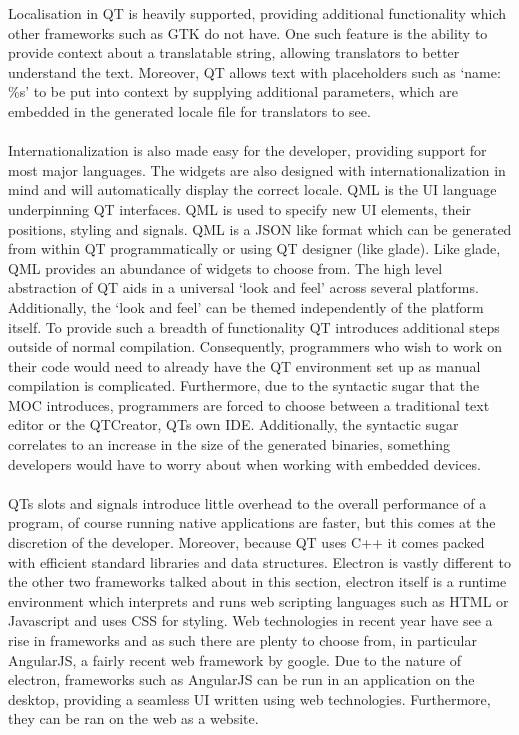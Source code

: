  Localisation in QT is heavily supported, providing additional functionality which other frameworks such as GTK do not have. One such feature is the ability to provide context about a translatable string, allowing translators to better understand the text. Moreover, QT allows text with placeholders such as `name: \%s' to be put into context by supplying additional parameters, which are embedded in the generated locale file for translators to see. \\\\
  Internationalization is also made easy for the developer, providing support for most major languages. The widgets are also designed with internationalization in mind and will automatically display the correct locale.
  QML is the UI language underpinning QT interfaces. QML is used to specify new UI elements, their positions, styling and signals. QML is a JSON like format which can be generated from within QT programmatically or using QT designer (like glade). Like glade, QML provides an abundance of widgets to choose from. The high level abstraction of QT aids in a universal `look and feel' across several platforms. Additionally, the `look and feel' can be themed independently of the platform itself.
  To provide such a breadth of functionality QT introduces additional steps outside of normal compilation. Consequently, programmers who wish to work on their code would need to already have the QT environment set up as manual compilation is complicated. Furthermore, due to the syntactic sugar that the MOC introduces, programmers are forced to choose between a traditional text editor or the QTCreator, QTs own IDE. Additionally,
  the syntactic sugar correlates to an increase in the size of the generated binaries, something developers would have to worry about when working with embedded devices.\\\\
  QTs slots and signals introduce little overhead to the overall performance of a program, of course running native applications are faster, but this comes at the discretion of the developer. Moreover, because QT uses C++ it comes packed with efficient standard libraries and data structures.
Electron is vastly different to the other two frameworks talked about in this section, electron itself is a runtime environment which interprets and runs web scripting languages such as HTML or Javascript and uses CSS for styling. Web technologies in recent year have see a rise in frameworks and as such there are plenty to choose from, in particular AngularJS, a fairly recent web framework by google. Due to the nature of electron, frameworks such as AngularJS can be run in an application on the desktop, providing a seamless UI written using web technologies. Furthermore, they can be ran on the web as a website.
